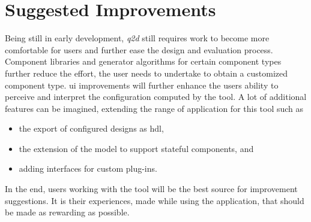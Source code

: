 \section{Suggested Improvements}

	Being still in early development, \emph{q2d} still requires work to become more comfortable for users and further ease the design and evaluation process.
	Component libraries and generator algorithms for certain component types further reduce the effort, the user needs to undertake to obtain a customized component type.
	\Gls{ui} improvements will further enhance the users ability to perceive and interpret the configuration computed by the tool.
	A lot of additional features can be imagined, extending the range of application for this tool such as
	
	\begin{itemize}
	
	\item the export of configured designs as \gls{hdl},
	\item the extension of the model to support stateful components, and
	\item adding interfaces for custom plug-ins.	
	
	\end{itemize}
	
	In the end, users working with the tool will be the best source for improvement suggestions.
	It is their experiences, made while using the application, that should be made as rewarding as possible.